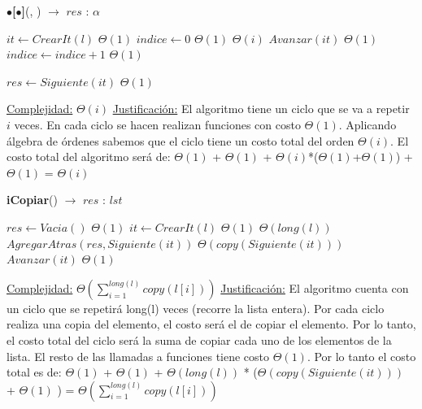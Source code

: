 \begin{Algoritmos}
\begin{algorithm}[H]{\textbf{$\bullet$[$\bullet$]}(, ) $\to$ $res$ : $\alpha$}	
	\begin{algorithmic}[1]
			 \State $it \gets CrearIt(l)$		\Comment $\Theta(1)$
			 \State $indice \gets 0$		\Comment $\Theta(1)$
			 			\Comment $\Theta(i)$
			 	\State $Avanzar(it)$		\Comment $\Theta(1)$
				\State $indice \gets indice + 1$		\Comment $\Theta(1)$
			 \EndWhile
			 
			 \State $res \gets Siguiente(it)$		\Comment $\Theta(1)$
    	
		\medskip
		\Statex \underline{Complejidad:} $\Theta(i)$
		\Statex \underline{Justificación:} El algoritmo tiene un ciclo que se va a repetir $i$ veces. En cada ciclo se hacen realizan funciones con costo $\Theta(1)$. Aplicando álgebra de órdenes sabemos que el ciclo tiene un costo total del orden $\Theta(i)$. El costo total del algoritmo será de:  $\Theta(1)$ + $\Theta(1)$ + $\Theta(i)$*($\Theta(1)$+$\Theta(1)$) + $\Theta(1)$ = $\Theta(i)$
    \end{algorithmic}
\end{algorithm}	

\begin{algorithm}[H]{\textbf{iCopiar}() $\to$ $res$ : $lst$}	
	\begin{algorithmic}[1]
			\State $res \gets Vacia()$	\Comment $\Theta(1)$
			\State $it \gets CrearIt(l)$	\Comment $\Theta(1)$
			 	\Comment $\Theta(long(l))$
			 	\State $AgregarAtras(res, Siguiente(it))$	\Comment $\Theta(copy(Siguiente(it)))$
				\State $Avanzar(it)$	\Comment $\Theta(1)$
			\EndWhile
    	
		\medskip
		\Statex \underline{Complejidad:} $\Theta\left(\sum_{i=1}^{long(l)}copy({l[i]})\right)$
		\Statex \underline{Justificación:} El algoritmo cuenta con un ciclo que se repetirá long(l) veces (recorre la lista entera). Por cada ciclo realiza una copia del elemento, el costo será el de copiar el elemento. Por lo tanto, el costo total del ciclo será la suma de copiar cada uno de los elementos de la lista. El resto de las llamadas a funciones tiene costo $\Theta(1)$. Por lo tanto el costo total es de: $\Theta(1)$  + $\Theta(1)$ + $\Theta(long(l))$ * ($\Theta(copy(Siguiente(it)))$ + $\Theta(1)$ ) = $\Theta\left(\sum_{i=1}^{long(l)}copy({l[i]})\right)$
    \end{algorithmic}
\end{algorithm}	


\end{Algoritmos}
